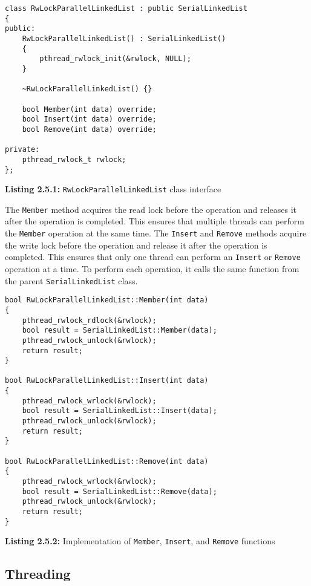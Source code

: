 \documentclass[a4paper,12pt]{article}
\begin{document}
\begin{lstlisting}
class RwLockParallelLinkedList : public SerialLinkedList
{
public:
    RwLockParallelLinkedList() : SerialLinkedList()
    {
        pthread_rwlock_init(&rwlock, NULL);
    }

    ~RwLockParallelLinkedList() {}

    bool Member(int data) override;
    bool Insert(int data) override;
    bool Remove(int data) override;

private:
    pthread_rwlock_t rwlock;
};
\end{lstlisting}
\begin{center}
    \textbf{Listing 2.5.1:} \lstinline|RwLockParallelLinkedList| class interface
\end{center}

The \lstinline|Member| method acquires the read lock before the operation and releases it after the operation is completed. This ensures that multiple threads can perform the \lstinline|Member| operation at the same time. The \lstinline|Insert| and \lstinline|Remove| methods acquire the write lock before the operation and release it after the operation is completed. This ensures that only one thread can perform an \lstinline|Insert| or \lstinline|Remove| operation at a time. To perform each operation, it calls the same function from the parent \lstinline|SerialLinkedList| class.

\begin{lstlisting}
bool RwLockParallelLinkedList::Member(int data)
{
    pthread_rwlock_rdlock(&rwlock);
    bool result = SerialLinkedList::Member(data);
    pthread_rwlock_unlock(&rwlock);
    return result;
}

bool RwLockParallelLinkedList::Insert(int data)
{
    pthread_rwlock_wrlock(&rwlock);
    bool result = SerialLinkedList::Insert(data);
    pthread_rwlock_unlock(&rwlock);
    return result;
}

bool RwLockParallelLinkedList::Remove(int data)
{
    pthread_rwlock_wrlock(&rwlock);
    bool result = SerialLinkedList::Remove(data);
    pthread_rwlock_unlock(&rwlock);
    return result;
}
\end{lstlisting}
\begin{center}
    \textbf{Listing 2.5.2:} Implementation of \lstinline|Member|, \lstinline|Insert|, and \lstinline|Remove| functions
\end{center}

\subsection{Threading}
\end{document}
